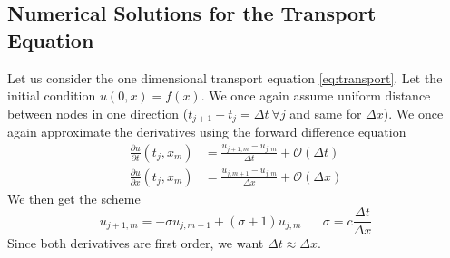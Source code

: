 \documentclass{article}
\newcommand{\pd}[2]{\frac{\partial #1}{\partial #2}}
\newcommand{\twen}{\hspace{20pt}}
\numberwithin{equation}{section}
\begin{document}
\subsection{Numerical Solutions for the Transport Equation}
Let us consider the one dimensional transport equation \eqref{eq:transport}. Let the initial condition $u(0,x)=f(x)$. We once again assume uniform distance between nodes in one direction ($t_{j+1}-t_j=\Delta t \ \forall j$ and same for $\Delta x$). We once again approximate the derivatives using the forward difference equation 
\begin{equation*}
    \begin{split}
        \pd{u}{t}(t_j,x_m)&=\frac{u_{j+1,m}-u_{j,m}}{\Delta t} + \mathcal{O}(\Delta t) \\
        \pd{u}{x}(t_j,x_m)&=\frac{u_{j,m+1}-u_{j,m}}{\Delta x} +\mathcal{O}(\Delta x)
    \end{split}
\end{equation*}
We then get the scheme 
\begin{equation}
    u_{j+1,m}=-\sigma u_{j,m+1}+(\sigma +1)u_{j,m} \twen \sigma = c\frac{\Delta t}{\Delta x} \label{eq:7.10}
\end{equation}
Since both derivatives are first order, we want $\Delta t \approx \Delta x$.
\end{document}
